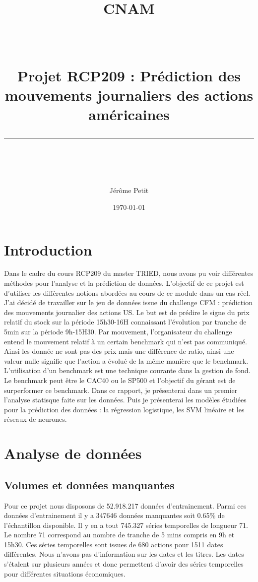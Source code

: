 \documentclass[12pt]{scrartcl} %
\title{	
	\normalfont\normalsize
	\textsc{CNAM}\\ %
	\vspace{25pt} %
	\rule{\linewidth}{0.5pt}\\ %
	\vspace{20pt} %
	{\huge Projet RCP209 : Prédiction des mouvements journaliers des actions américaines }\\ %
	\vspace{12pt} %
	\rule{\linewidth}{2pt}\\ %
	\vspace{12pt} %
}
\author{\LARGE Jérôme Petit} %
\date{\normalsize\today} %
\begin{document}
\maketitle %


\section{Introduction}
Dans le cadre du cours RCP209 du master TRIED, nous avons pu voir différentes m\'{e}thodes pour  l'analyse et la pr\'{e}diction de donn\'{e}es. L'objectif de ce projet est d'utiliser les diff\'{e}rentes notions abord\'{e}es au cours de ce module dans un cas r\'{e}el. J'ai d\'{e}cid\'{e} de travailler sur le jeu de donn\'{e}es issue du challenge CFM : pr\'{e}diction des mouvements journalier des actions US. Le but est de pr\'{e}dire le signe du prix relatif du stock sur la p\'{e}riode 15h30-16H connaissant l'\'{e}volution par tranche de 5min sur la p\'{e}riode 9h-15H30. Par mouvement, l'organisateur du challenge entend le mouvement relatif \`{a} un certain benchmark qui n'est pas communiqu\'{e}. Ainsi les donn\'{e}e ne sont pas des prix mais une différence de ratio, ainsi une valeur nulle signifie que l'action a \'{e}volu\'{e} de la même manière que le benchmark. L'utilisation d'un benchmark est une technique courante dans la gestion de fond. Le benchmark peut être le CAC40 ou le SP500 et l'objectif du g\'{e}rant est de surperformer ce benchmark.\newline
Dans ce rapport, je pr\'{e}senterai dans un premier l'analyse statisque faite sur les données. Puis je présenterai les modèles étudiées pour la prédiction des données : la régression logistique, les SVM linéaire et les réseaux de neurones.
\section{Analyse de données}
\subsection{Volumes et données manquantes}
Pour ce projet nous disposons de 52.918.217 données d'entrainement. Parmi ces données d'entrainement il y a 347646 données manquantes soit 0.65\% de l'échantillon disponible. Il y en a tout 745.327 séries temporelles de longueur 71. Le nombre 71 correspond au nombre de tranche de 5 mins compris en 9h et 15h30. Ces séries temporelles sont issues de 680 actions pour 1511 dates différentes. Nous n'avons pas d'information sur les dates et les titres. Les dates s'étalent sur plusieurs années et donc permettent d'avoir des séries temporelles pour différentes situations économiques.
\end{document}
